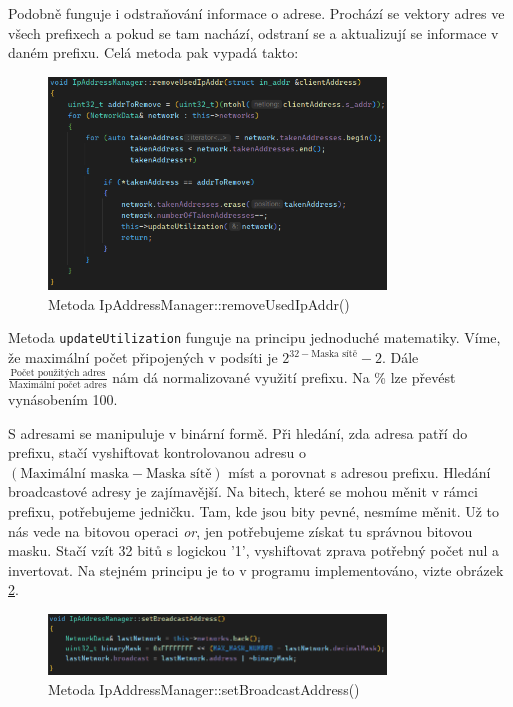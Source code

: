 \documentclass[a4paper, 11pt, hidelinks]{article}
\begin{document}
Podobně funguje i odstraňování informace o adrese.
Prochází se vektory adres ve všech prefixech a pokud se tam nachází, odstraní se a aktualizují se informace v daném prefixu.
Celá metoda pak vypadá takto:
\begin{figure}[h]
    \centering
    \includegraphics[width=0.8\textwidth]{img/removeUsedIpAddr.png}
    \caption{Metoda IpAddressManager::removeUsedIpAddr()}
    \label{pic:removeUsedIpAddr}
\end{figure}

Metoda \texttt{updateUtilization} funguje na principu jednoduché matematiky.
Víme, že maximální počet připojených v podsíti je $2^{32-\text{Maska sítě}}-2$.
Dále $ \frac{\text{Počet použitých adres}}{\text{Maximální počet adres}}$ nám dá normalizované využití prefixu. 
Na \% lze převést vynásobením 100.

S adresami se manipuluje v binární formě. Při hledání, zda adresa patří do prefixu, stačí vyshiftovat kontrolovanou adresu o $(\text{Maximální maska} - \text{Maska sítě})$ míst a porovnat s adresou prefixu.
Hledání broadcastové adresy je zajímavější. Na bitech, které se mohou měnit v rámci prefixu, potřebujeme jedničku.
Tam, kde jsou bity pevné, nesmíme měnit. Už to nás vede na bitovou operaci \emph{or}, jen potřebujeme získat tu správnou bitovou masku.
Stačí vzít 32 bitů s logickou '1', vyshiftovat zprava potřebný počet nul a invertovat.
Na stejném principu je to v programu implementováno, vizte obrázek \ref{pic:setBroadcastAddress}.

\begin{figure}[t]
    \centering
    \includegraphics[width=0.8\textwidth]{img/setBroadcastAddress.png}
    \caption{Metoda IpAddressManager::setBroadcastAddress()}
    \label{pic:setBroadcastAddress}
\end{figure}
\end{document}
